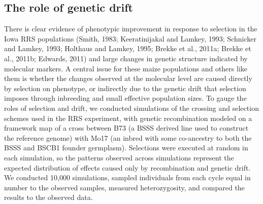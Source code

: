 
\subsection*{The role of genetic drift}
There is clear evidence of phenotypic improvement in response to selection in the Iowa RRS populations (Smith, 1983; Keeratinijakal and Lamkey, 1993; Schnicker and Lamkey, 1993; Holthaus and Lamkey, 1995; Brekke et al., 2011a; Brekke et al., 2011b; Edwards, 2011) and large changes in genetic structure indicated by molecular markers. 
A central issue for these maize populations and others like them is whether the changes observed at the molecular level are caused directly by selection on phenotype, or indirectly due to the genetic drift that selection imposes through inbreeding and small effective population sizes. 
To gauge the roles of selection and drift, we conducted simulations of the crossing and selection schemes used in the RRS experiment, with genetic recombination modeled on a framework map of a cross between B73 (a BSSS derived line used to construct the reference genome) with Mo17 (an inbred with some co-ancestry to both the BSSS and BSCB1 founder germplasm)\citep{gerdes1993compilation}. 
Selections were executed at random in each simulation, so the patterns observed across simulations represent the expected distribution of effects caused only by recombination and genetic drift. 
We conducted 10,000 simulations, sampled individuals from each cycle equal in number to the observed samples, measured heterozygosity, and compared the results to the observed data. 	
	
